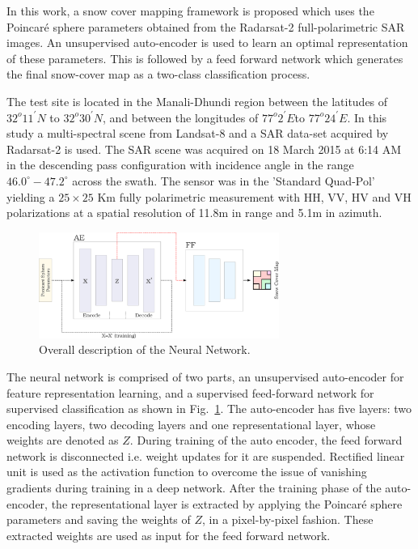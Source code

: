 \documentclass[12pt, a4paper]{article}
\begin{document}
In this work, a snow cover mapping framework is proposed which uses the Poincar\'e sphere parameters obtained from the Radarsat-2 full-polarimetric SAR images. An unsupervised auto-encoder is used to learn an optimal representation of these parameters. This is followed by a feed forward network which generates the final snow-cover map as a two-class classification process.

The test site is located in the Manali-Dhundi region between the latitudes of $32^{o} 11^{'} N$ to $32^{o} 30^{'} N$, and between the longitudes of $77^{o} 2^{'} E$to $77^{o} 24^{'} E$. In this study a multi-spectral scene from Landsat-8 and a SAR data-set acquired by Radarsat-2 is used. The SAR scene was acquired on 18 March 2015 at 6:14 AM in the descending pass configuration with incidence angle in the range $46.0^\circ-47.2^\circ$ across the swath. The sensor was in the 'Standard Quad-Pol' yielding a $25\times25$ Km fully polarimetric measurement with HH, VV, HV and VH polarizations at a spatial resolution of 11.8m in range and 5.1m in azimuth.

\begin{figure}
\centering
\includegraphics[width=0.7\textwidth]{Figures/SnowCover2018/FlowChart}
\caption{Overall description of the Neural Network.}
\label{fig:flow}
\end{figure}

The neural network is comprised of two parts, an unsupervised auto-encoder for feature representation learning, and a supervised feed-forward network for supervised classification as shown in Fig.~\ref{fig:flow}. 
%
The auto-encoder has five layers: two encoding layers, two decoding layers and one representational layer, whose weights are denoted as $Z$. During training of the auto encoder, the feed forward network is disconnected i.e. weight updates for it are suspended. Rectified linear unit is used as the activation function to overcome the issue of vanishing gradients during training in a deep network. After the training phase of the auto-encoder, the representational layer is extracted by applying the Poincar\'e sphere parameters and saving the weights of $Z$, in a pixel-by-pixel fashion. These extracted weights are used as input for the feed forward network. 
\end{document}
